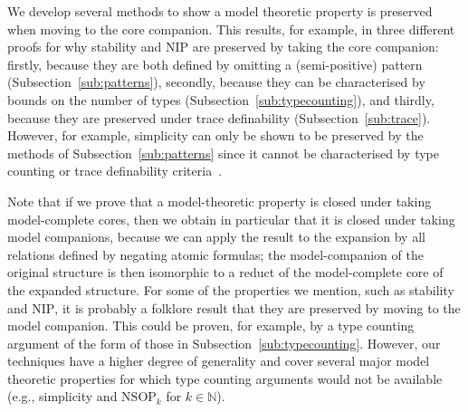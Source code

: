 \documentclass{amsart}
\theoremstyle{definition}
\theoremstyle{remark}
\numberwithin{equation}{section}
\begin{document}
\begin{center}
\begin{table}[]
\vspace{1em}
\caption{We list the various model theoretic properties that we prove to be preserved under core companions in this section. 
Note: we do not define all of these properties, but we give references to the relevant definitions. We favour references including multiple definitions to the original reference where a concept is introduced. In the last column we indicate which methods can be used to show the relevant preservation result.
}\label{table1}
\end{table}
\end{center}



 We develop several methods  to show a model theoretic property is preserved when moving to the
core companion. This results, for example, in three different proofs for why stability and $\mathrm{NIP}$ are preserved by taking the 
core companion: {firstly,} because they are both defined by omitting a (semi-positive) pattern (Subsection~\ref{sub:patterns}), {secondly,} because they can be characterised by bounds on the number of types (Subsection~\ref{sub:typecounting}), and {thirdly,} because they are preserved under trace definability (Subsection~\ref{sub:trace}). However, for example, simplicity can only be shown to be preserved by the methods of Subsection~\ref{sub:patterns} since it cannot be characterised by type counting or trace definability criteria~\cite{Walsbergshort}. 


	Note that if we prove that a model-theoretic property is closed under taking model-complete cores, then we obtain in particular that it is closed under taking model companions, because we can apply the result to the expansion by all relations defined by negating atomic formulas; the model-companion of the original structure is then isomorphic to a reduct of the model-complete core of the expanded structure. For some of the properties we mention, such as stability and $\mathrm{NIP}$, it is probably a folklore result that they are preserved by moving to the model companion. This could be proven, for example, by a type counting argument of the form of those in Subsection~\ref{sub:typecounting}. However, our techniques have a higher degree of generality and cover several major model theoretic properties for which type counting arguments would not be available (e.g., simplicity and $\mathrm{NSOP}_k$ for $k\in\mathbb{N}$). 
    
\end{document}
